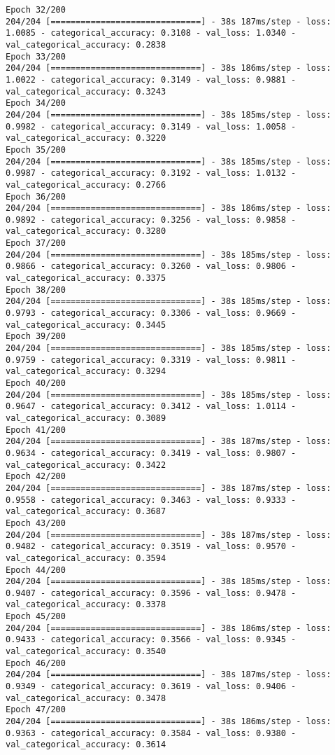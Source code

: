 \begin{lstlisting}
Epoch 32/200
204/204 [==============================] - 38s 187ms/step - loss: 1.0085 - categorical_accuracy: 0.3108 - val_loss: 1.0340 - val_categorical_accuracy: 0.2838
Epoch 33/200
204/204 [==============================] - 38s 186ms/step - loss: 1.0022 - categorical_accuracy: 0.3149 - val_loss: 0.9881 - val_categorical_accuracy: 0.3243
Epoch 34/200
204/204 [==============================] - 38s 185ms/step - loss: 0.9982 - categorical_accuracy: 0.3149 - val_loss: 1.0058 - val_categorical_accuracy: 0.3220
Epoch 35/200
204/204 [==============================] - 38s 185ms/step - loss: 0.9987 - categorical_accuracy: 0.3192 - val_loss: 1.0132 - val_categorical_accuracy: 0.2766
Epoch 36/200
204/204 [==============================] - 38s 186ms/step - loss: 0.9892 - categorical_accuracy: 0.3256 - val_loss: 0.9858 - val_categorical_accuracy: 0.3280
Epoch 37/200
204/204 [==============================] - 38s 185ms/step - loss: 0.9866 - categorical_accuracy: 0.3260 - val_loss: 0.9806 - val_categorical_accuracy: 0.3375
Epoch 38/200
204/204 [==============================] - 38s 185ms/step - loss: 0.9793 - categorical_accuracy: 0.3306 - val_loss: 0.9669 - val_categorical_accuracy: 0.3445
Epoch 39/200
204/204 [==============================] - 38s 185ms/step - loss: 0.9759 - categorical_accuracy: 0.3319 - val_loss: 0.9811 - val_categorical_accuracy: 0.3294
Epoch 40/200
204/204 [==============================] - 38s 185ms/step - loss: 0.9647 - categorical_accuracy: 0.3412 - val_loss: 1.0114 - val_categorical_accuracy: 0.3089
Epoch 41/200
204/204 [==============================] - 38s 187ms/step - loss: 0.9634 - categorical_accuracy: 0.3419 - val_loss: 0.9807 - val_categorical_accuracy: 0.3422
Epoch 42/200
204/204 [==============================] - 38s 187ms/step - loss: 0.9558 - categorical_accuracy: 0.3463 - val_loss: 0.9333 - val_categorical_accuracy: 0.3687
Epoch 43/200
204/204 [==============================] - 38s 187ms/step - loss: 0.9482 - categorical_accuracy: 0.3519 - val_loss: 0.9570 - val_categorical_accuracy: 0.3594
Epoch 44/200
204/204 [==============================] - 38s 185ms/step - loss: 0.9407 - categorical_accuracy: 0.3596 - val_loss: 0.9478 - val_categorical_accuracy: 0.3378
Epoch 45/200
204/204 [==============================] - 38s 186ms/step - loss: 0.9433 - categorical_accuracy: 0.3566 - val_loss: 0.9345 - val_categorical_accuracy: 0.3540
Epoch 46/200
204/204 [==============================] - 38s 187ms/step - loss: 0.9349 - categorical_accuracy: 0.3619 - val_loss: 0.9406 - val_categorical_accuracy: 0.3478
Epoch 47/200
204/204 [==============================] - 38s 186ms/step - loss: 0.9363 - categorical_accuracy: 0.3584 - val_loss: 0.9380 - val_categorical_accuracy: 0.3614

\end{lstlisting}
